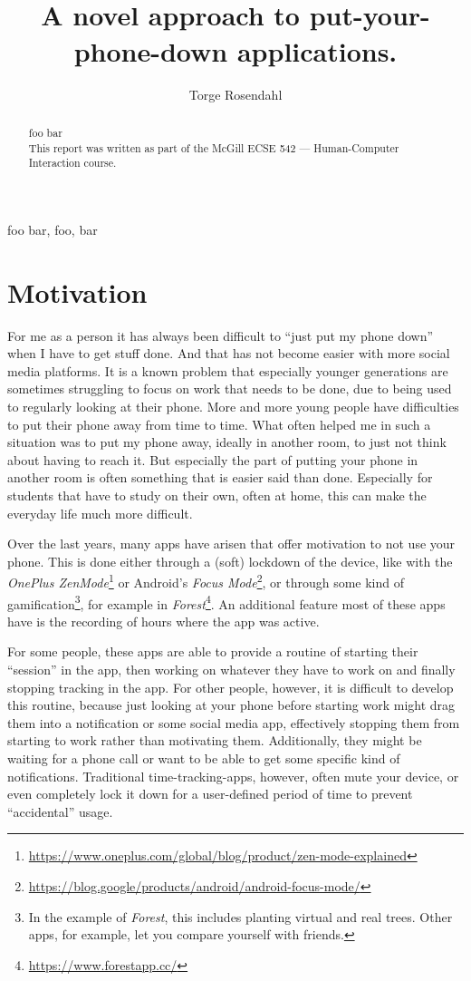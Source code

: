 \documentclass[conference]{IEEEtran}
\title{\projectname\\\Large{A novel approach to put-your-phone-down applications.}}
\author{Torge Rosendahl}
\begin{document}
\maketitle

\begin{abstract}
foo bar
\\
This report was written as part of the McGill ECSE 542 --- Human-Computer Interaction course.
\end{abstract}

\begin{IEEEkeywords}
foo bar, foo, bar
\end{IEEEkeywords}

\section{Motivation}
For me as a person it has always been difficult to ``just put my phone down'' when I have to get stuff done. And that has not become easier with more social media platforms. It is a known problem that especially younger generations are sometimes struggling to focus on work that needs to be done, due to being used to regularly looking at their phone. More and more young people have difficulties to put their phone away from time to time. What often helped me in such a situation was to put my phone away, ideally in another room, to just not think about having to reach it. But especially the part of putting your phone in another room is often something that is easier said than done. Especially for students that have to study on their own, often at home, this can make the everyday life much more difficult.

Over the last years, many apps have arisen that offer motivation to not use your phone. This is done either through a (soft) lockdown of the device, like with the \textit{OnePlus ZenMode}\footnote{\url{https://www.oneplus.com/global/blog/product/zen-mode-explained}} or Android's \textit{Focus Mode}\footnote{\url{https://blog.google/products/android/android-focus-mode/}}, or through some kind of gamification\footnote{In the example of \textit{Forest}, this includes planting virtual and real trees. Other apps, for example, let you compare yourself with friends.}, for example in \textit{Forest}\footnote{\url{https://www.forestapp.cc/}}. An additional feature most of these apps have is the recording of hours where the app was active.

For some people, these apps are able to provide a routine of starting their ``session'' in the app, then working on whatever they have to work on and finally stopping tracking in the app. For other people, however, it is difficult to develop this routine, because just looking at your phone before starting work might drag them into a notification or some social media app, effectively stopping them from starting to work rather than motivating them. Additionally, they might be waiting for a phone call or want to be able to get some specific kind of notifications. Traditional time-tracking-apps, however, often mute your device, or even completely lock it down for a user-defined period of time to prevent ``accidental'' usage.
\end{document}
